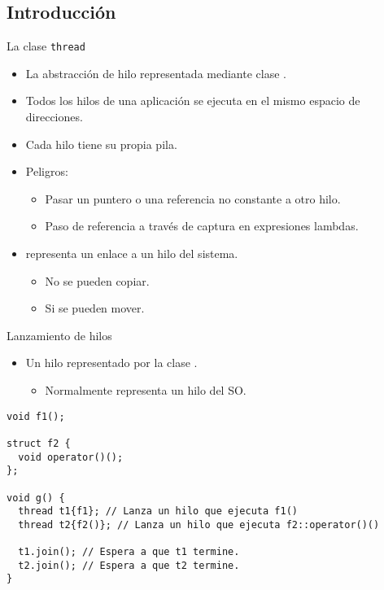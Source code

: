 \subsection{Introducción}

\begin{frame}[t]{La clase \texttt{thread}}
\begin{itemize}
  \item La abstracción de hilo representada mediante clase .
  \item Todos los hilos de una aplicación se ejecuta en el mismo espacio de direcciones.
  \item Cada hilo tiene su propia pila.
  \pause
  \item \alert{Peligros}:
    \begin{itemize}
      \item Pasar un puntero o una referencia no constante a otro hilo.
      \item Paso de referencia a través de captura en expresiones lambdas.
    \end{itemize}
  \item {} representa un enlace a un hilo del sistema.
    \begin{itemize}
      \item No se pueden copiar.
      \item Si se pueden mover.
    \end{itemize}
\end{itemize}
\end{frame}

\begin{frame}[fragile]{Lanzamiento de hilos}
\begin{itemize}
  \item Un hilo representado por la clase .
    \begin{itemize}
      \item Normalmente representa un hilo del SO.
    \end{itemize}
\end{itemize}
\begin{block}{}
\begin{lstlisting}
void f1();

struct f2 {
  void operator()();
};

void g() {
  thread t1{f1}; // Lanza un hilo que ejecuta f1()
  thread t2{f2()}; // Lanza un hilo que ejecuta f2::operator()()

  t1.join(); // Espera a que t1 termine.
  t2.join(); // Espera a que t2 termine.
}
\end{lstlisting}
\end{block}
\end{frame}

